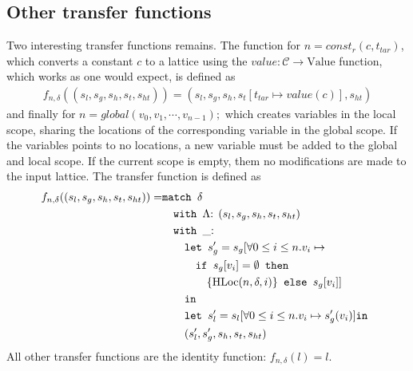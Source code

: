 \subsection{Other transfer functions}
Two interesting transfer functions remains. The function for $n = \mathit{const}_r(c, t_{tar})$, which converts a constant $c$ to a lattice using the $value : \mathcal{C} \rightarrow \text{Value}$ function, which works as one would expect, is defined as
\begin{align}
f_{n,\delta}((s_l, s_g, s_h, s_t,s_{ht})) = (s_l, s_g, s_h, s_t[t_{tar} \mapsto value(c)], s_{ht})
\end{align}
and finally for $n = global(v_0, v_1, \cdots, v_{n-1});$ which creates variables in the local scope, sharing the locations of the corresponding variable in the global scope. If the variables points to no locations, a new variable must be added to the global and local scope. If the current scope is empty, them no modifications are made to the input lattice. The transfer function is defined as
\begin{align}
f_{n, \delta} ((s_l,s_g,s_h,s_t, s_{ht})) =     &\texttt{match }\delta\notag\\
                                                &\quad\texttt{with }\Lambda\text{: }(s_l,s_g,s_h,s_t, s_{ht})\notag\\
                                                &\quad\texttt{with }\_\text{: }\notag\\
                                                &\quad\quad\texttt{let } s_g' = s_g[\forall 0\leq i \leq n. v_i\mapsto \notag\\                                                
                                                &\quad\quad\quad\texttt{if }s_g[v_i] = \emptyset\texttt{ then } \notag\\
                                                &\quad\quad\quad\quad\{\text{HLoc}(n, \delta, i)\} \texttt{ else } s_g[v_i]]\notag\\
                                                &\quad\quad \texttt{in } \notag\\
                                                &\quad\quad\texttt{let } s_l'=s_l[\forall 0\leq i \leq n. v_i\mapsto s_g'(v_i)] \texttt{in }\notag\\
                                                &\quad\quad(s_l',s_g',s_h,s_t, s_{ht})
\end{align}
All other transfer functions are the identity function: $f_{n,\delta}(l) = l$.

